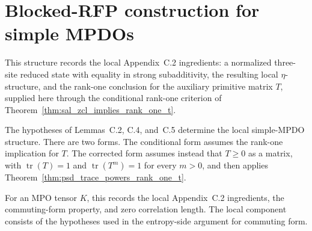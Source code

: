 \section{Blocked-RFP construction for simple MPDOs}

\begin{definition}
    \label{def:simple_mpdo_local_structure_data}
    \leanok
    This structure records the local Appendix~C.2 ingredients: a normalized
    three-site reduced state with equality in strong subadditivity, the
    resulting local $\eta$-structure, and the rank-one conclusion for the
    auxiliary primitive matrix $T$, supplied here through the conditional
    rank-one criterion of Theorem~\ref{thm:sal_zcl_implies_rank_one_t}.
\end{definition}

\begin{theorem}
    \label{thm:simple_mpdo_local_structure_data_of_sal_zcl}
    \leanok
    The hypotheses of Lemmas~C.2, C.4, and~C.5 determine the local simple-MPDO
    structure. There are two forms. The conditional form assumes the
    rank-one implication for $T$. The corrected form assumes instead that
    $T\ge 0$ as a matrix, with $\operatorname{tr}(T)=1$ and
    $\operatorname{tr}(T^m)=1$ for every $m>0$, and then applies
    Theorem~\ref{thm:psd_trace_powers_rank_one_t}.
\end{theorem}

\begin{definition}
    \label{def:simple_mpdo_blocked_rfp_data}
    \leanok
    For an MPO tensor $K$, this records the local Appendix~C.2 ingredients, the
    commuting-form property, and zero correlation length. The local component
    consists of the hypotheses used in the entropy-side argument for commuting form.
\end{definition}

